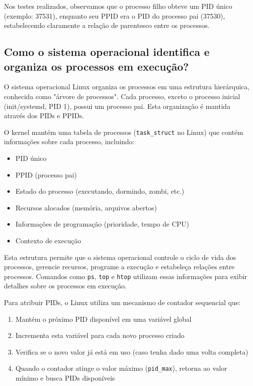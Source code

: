 \documentclass[a4paper,11pt]{article}
\begin{document}
Nos testes realizados, observamos que o processo filho obteve um PID único (exemplo: 37531), enquanto seu PPID era o PID do processo pai (37530), estabelecendo claramente a relação de parentesco entre os processos.

\subsection{Como o sistema operacional identifica e organiza os processos em execução?}

O sistema operacional Linux organiza os processos em uma estrutura hierárquica, conhecida como "árvore de processos". Cada processo, exceto o processo inicial (init/systemd, PID 1), possui um processo pai. Esta organização é mantida através dos PIDs e PPIDs.

O kernel mantém uma tabela de processos (\texttt{task\_struct} no Linux) que contém informações sobre cada processo, incluindo:
\begin{itemize}
    \item PID único
    \item PPID (processo pai)
    \item Estado do processo (executando, dormindo, zombi, etc.)
    \item Recursos alocados (memória, arquivos abertos)
    \item Informações de programação (prioridade, tempo de CPU)
    \item Contexto de execução
\end{itemize}

Esta estrutura permite que o sistema operacional controle o ciclo de vida dos processos, gerencie recursos, programe a execução e estabeleça relações entre processos. Comandos como \texttt{ps}, \texttt{top} e \texttt{htop} utilizam essas informações para exibir detalhes sobre os processos em execução.

Para atribuir PIDs, o Linux utiliza um mecanismo de contador sequencial que:
\begin{enumerate}
    \item Mantém o próximo PID disponível em uma variável global
    \item Incrementa esta variável para cada novo processo criado
    \item Verifica se o novo valor já está em uso (caso tenha dado uma volta completa)
    \item Quando o contador atinge o valor máximo (\texttt{pid\_max}), retorna ao valor mínimo e busca PIDs disponíveis
\end{enumerate}
\end{document}
